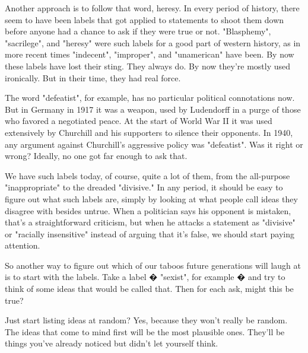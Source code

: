 Another approach is to
                  follow that word, heresy. In every period of history, there
                  seem to have been labels that got applied to statements to
                  shoot them down before anyone had a chance to ask if they were
                  true or not. "Blasphemy", "sacrilege", and "heresy" were such
                  labels for a good part of western history, as in more recent
                  times "indecent", "improper", and "unamerican" have been. By
                  now these labels have lost their sting. They always do. By now
                  they're mostly used ironically. But in their time, they had
                  real force.

The word "defeatist", for example, has
                  no particular political connotations now. But in Germany in
                  1917 it was a weapon, used by Ludendorff in a purge of those
                  who favored a negotiated peace. At the start of World War II
                  it was used extensively by Churchill and his supporters to
                  silence their opponents. In 1940, any argument against
                  Churchill's aggressive policy was "defeatist". Was it right or
                  wrong? Ideally, no one got far enough to ask that.


                  We have such labels today, of course, quite a lot of them,
                  from the all-purpose "inappropriate" to the dreaded
                  "divisive." In any period, it should be easy to figure out
                  what such labels are, simply by looking at what people call
                  ideas they disagree with besides untrue. When a politician
                  says his opponent is mistaken, that's a straightforward
                  criticism, but when he attacks a statement as "divisive" or
                  "racially insensitive" instead of arguing that it's false, we
                  should start paying attention.

So another way to
                  figure out which of our taboos future generations will laugh
                  at is to start with the labels. Take a label � "sexist", for
                  example � and try to think of some ideas that would be called
                  that. Then for each ask, might this be true?

Just
                  start listing ideas at random? Yes, because they won't really
                  be random. The ideas that come to mind first will be the most
                  plausible ones. They'll be things you've already noticed but
                  didn't let yourself think.

